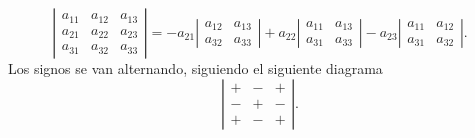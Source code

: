 $$
     \left |\begin{array}{ccc}
                 a_{11} &  a_{12} &a_{13}\\[1mm]
                 a_{21} &  a_{22}&a_{23}\\[1mm]
		 a_{31} &  a_{32}&a_{33}
              \end{array}\right |=
      -a_{21} \left |\begin{array}{cc}
                  a_{12} &a_{13}\\[1mm]
                 a_{32} &  a_{33}
              \end{array}\right |+
      a_{22} \left |\begin{array}{cc}
                  a_{11} &a_{13}\\[1mm]
                 a_{31} &  a_{33}
              \end{array}\right | -
       a_{23} \left |\begin{array}{cc}
                  a_{11} &a_{12}\\[1mm]
                 a_{31} &  a_{32}
              \end{array}\right |. 	      	        	      	      
$$
Los signos se van alternando, siguiendo el siguiente diagrama
$$
     \left |\begin{array}{ccc}
                 + &  - & +\\[1mm]
                 - &  + & -\\[1mm]
		 + & -  &+
              \end{array}\right |. 	      	        	      	      
$$

